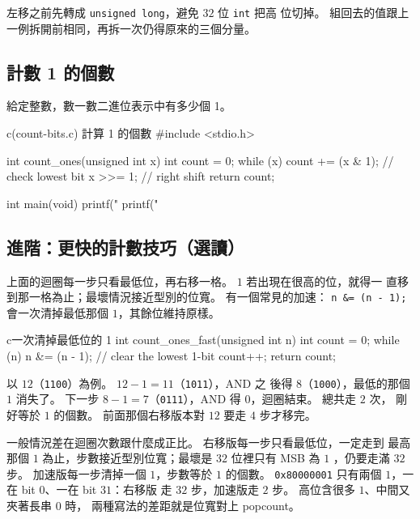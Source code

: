 左移之前先轉成 \texttt{unsigned long}，避免 $32$ 位 \texttt{int} 把高
位切掉。 組回去的值跟上一例拆開前相同，再拆一次仍得原來的三個分量。

\subsection{計數 1 的個數}

給定整數，數一數二進位表示中有多少個 1。

\begin{example}{c}{(count-bits.c) 計算 1 的個數}
#include <stdio.h>

int count_ones(unsigned int x) {
    int count = 0;
    while (x) {
        count += (x & 1);  // check lowest bit
        x >>= 1;           // right shift
    }
    return count;
}

int main(void) {
    printf("%
    printf("%
}
\end{example}


\subsection{進階：更快的計數技巧（選讀）}

上面的迴圈每一步只看最低位，再右移一格。 $1$ 若出現在很高的位，就得一
直移到那一格為止；最壞情況接近型別的位寬。 有一個常見的加速：
\texttt{n \&= (n - 1);} 會一次清掉最低那個 $1$，其餘位維持原樣。

\begin{code}{c}{一次清掉最低位的 1}
int count_ones_fast(unsigned int n) {
    int count = 0;
    while (n) {
        n &= (n - 1);   // clear the lowest 1-bit
        count++;
    }
    return count;
}
\end{code}

以 $12$（\texttt{1100}）為例。 $12 - 1 = 11$（\texttt{1011}），AND 之
後得 $8$（\texttt{1000}），最低的那個 $1$ 消失了。 下一步
$8 - 1 = 7$（\texttt{0111}），AND 得 $0$，迴圈結束。 總共走 $2$ 次，
剛好等於 $1$ 的個數。 前面那個右移版本對 $12$ 要走 $4$ 步才移完。

一般情況差在迴圈次數跟什麼成正比。 右移版每一步只看最低位，一定走到
最高那個 $1$ 為止，步數接近型別位寬；最壞是 $32$ 位裡只有 MSB 為 $1$
，仍要走滿 $32$ 步。 加速版每一步清掉一個 $1$，步數等於 $1$ 的個數。
\texttt{0x80000001} 只有兩個 $1$，一在 bit $0$、一在 bit $31$：右移版
走 $32$ 步，加速版走 $2$ 步。 高位含很多 $1$、中間又夾著長串 $0$ 時，
兩種寫法的差距就是位寬對上 popcount。


